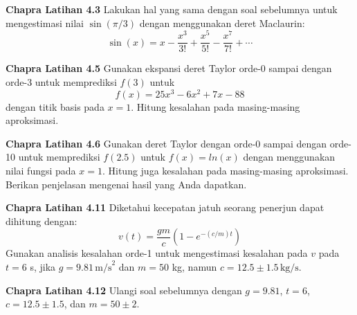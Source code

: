 \begin{soal}
\textbf{Chapra Latihan 4.3}
Lakukan hal yang sama dengan soal sebelumnya untuk mengestimasi nilai $\sin(\pi/3)$
dengan menggunakan deret Maclaurin:
\begin{equation*}
\sin(x) = x - \frac{x^3}{3!} + \frac{x^5}{5!} - \frac{x^7}{7!} + \cdots
\end{equation*}
\end{soal}

\begin{soal}
\textbf{Chapra Latihan 4.5}
Gunakan ekspansi deret Taylor orde-0 sampai dengan orde-3 untuk
memprediksi $f(3)$ untuk
\begin{equation*}
f(x) = 25x^3 - 6x^2 + 7x - 88
\end{equation*}
dengan titik basis pada $x=1$. Hitung kesalahan pada masing-masing aproksimasi.
\end{soal}

\begin{soal}
\textbf{Chapra Latihan 4.6}
Gunakan deret Taylor dengan orde-0 sampai dengan orde-10 untuk memprediksi
$f(2.5)$ untuk $f(x) = ln(x)$ dengan menggunakan nilai fungsi pada $x=1$.
Hitung juga kesalahan pada masing-masing aproksimasi. Berikan penjelasan mengenai hasil
yang Anda dapatkan.
\end{soal}

\begin{soal}
\textbf{Chapra Latihan 4.11}
Diketahui kecepatan jatuh seorang penerjun dapat dihitung dengan:
\begin{equation*}
v(t) = \frac{gm}{c}(1 - e^{-(c/m)t})
\end{equation*}
Gunakan analisis kesalahan orde-1 untuk mengestimasi kesalahan pada $v$ pada $t=6$ s,
jika $g = 9.81\,\mathrm{m/s}^{2}$ dan $m=50$ kg, namun
$c = 12.5 \pm 1.5 \, \mathrm{kg/s}$.
\end{soal}

\begin{soal}
\textbf{Chapra Latihan 4.12}
Ulangi soal sebelumnya dengan $g = 9.81$, $t = 6$, $c = 12.5 \pm 1.5$,
dan $m = 50 \pm 2$.
\end{soal}


